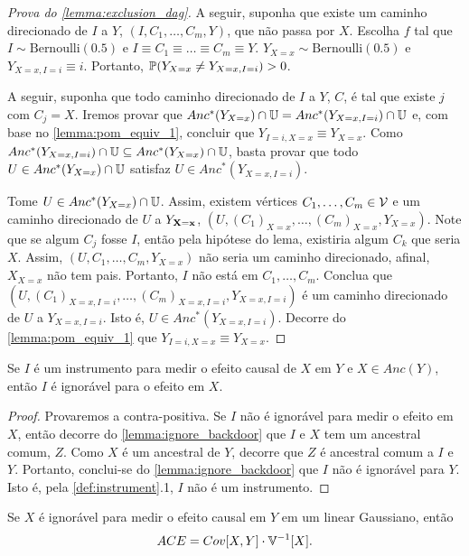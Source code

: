 \begin{proof}[Prova do \cref{lemma:exclusion_dag}]
 A seguir, suponha que existe um caminho direcionado de 
 $I$ a $Y$, $(I,C_1,\ldots,C_m,Y)$, que não passa por $X$.
 Escolha $f$ tal que $I \sim \text{Bernoulli}(0.5)$ e
 $I \equiv C_1 \equiv \ldots \equiv C_m \equiv Y$.
 $Y_{X=x} \sim \text{Bernoulli}(0.5)$ e
 $Y_{X=x,I=i} \equiv i$. Portanto,
 $\P(Y_{X=x} \neq Y_{X=x,I=i}) > 0$.

 A seguir, suponha que todo caminho direcionado de 
 $I$ a $Y$, $C$, é tal que existe $j$ com $C_j = X$.
 Iremos provar que 
 $Anc^*(Y_{X=x}) \cap \U = Anc^*(Y_{X=x,I=i}) \cap \U$ e,
 com base no \cref{lemma:pom_equiv_1}, concluir que
 $Y_{I=i,X=x} \equiv Y_{X=x}$.
 Como $Anc^*(Y_{X=x,I=i}) \cap \U 
 \subseteq Anc^*(Y_{X=x}) \cap \U$,
 basta provar que 
 todo $U \in Anc^*(Y_{X=x}) \cap \U$ satisfaz
 $U \in Anc^*(Y_{X=x,I=i})$.
 
 Tome $U \in Anc^*(Y_{X=x}) \cap \U$.
 Assim, existem vértices
 $C_1,\ldots,C_m \in \sV$ e
 um caminho direcionado de
 $U$ a $Y_{\X=\x}$,
 $(U,(C_1)_{X=x},\ldots,(C_m)_{X=x},Y_{X=x})$.
 Note que se algum $C_j$ fosse $I$, então
 pela hipótese do lema, existiria algum $C_k$
 que seria $X$. Assim,
 $(U,C_1,\ldots,C_m,Y_{X=x})$ 
 não seria um caminho direcionado,
 afinal, $X_{X=x}$ não tem pais.
 Portanto, $I$ não está em $C_1,\ldots,C_m$.
 Conclua que 
 $(U,(C_1)_{X=x,I=i},\ldots,(C_m)_{X=x,I=i},Y_{X=x,I=i})$ é
 um caminho direcionado de $U$ a $Y_{X=x,I=i}$.
 Isto é, $U \in Anc^*(Y_{X=x,I=i})$.
 Decorre do \cref{lemma:pom_equiv_1} que
 $Y_{I=i,X=x} \equiv Y_{X=x}$.
\end{proof}

\begin{lemma}
 \label{lemma:instrument_ignore}
 Se $I$ é um instrumento para medir 
 o efeito causal de $X$ em $Y$ e
 $X \in Anc(Y)$, então
 $I$ é ignorável para o efeito em $X$.
\end{lemma}

\begin{proof}
 Provaremos a contra-positiva.
 Se $I$ não é ignorável para medir o efeito em $X$,
 então decorre do \cref{lemma:ignore_backdoor} que
 $I$ e $X$ tem um ancestral comum, $Z$.
 Como $X$ é um ancestral de $Y$,
 decorre que $Z$ é ancestral comum a $I$ e $Y$.
 Portanto, conclui-se do \cref{lemma:ignore_backdoor} que
 $I$ não é ignorável para $Y$.
 Isto é, pela \cref{def:instrument}.1,
 $I$ não é um instrumento.
\end{proof}

\begin{lemma}
 \label{lemma:cm_linear_ignore}
 Se $X$ é ignorável para medir
 o efeito causal em $Y$ em um
 \CM linear Gaussiano, então
 \begin{align*}
  \ACE = Cov[X,Y] \cdot \V^{-1}[X].
 \end{align*}
\end{lemma}

